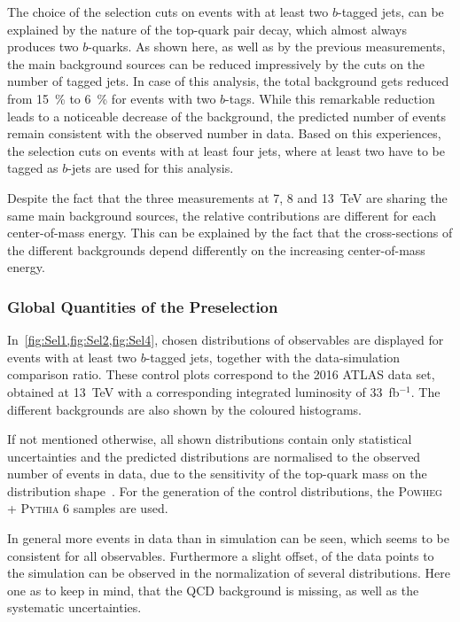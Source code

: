 The choice of the selection cuts on events with at least two $b$-tagged jets, can be explained by the nature of the top-quark pair decay, which almost always produces two $b$-quarks.  As shown here, as well as by the previous measurements, the main background sources can be reduced impressively by the cuts on the number of tagged jets. In case of this analysis, the total background gets reduced from  15~\% to 6~\% for events with two  $b$-tags. While this remarkable reduction leads to a noticeable decrease of the background, the predicted number of events remain consistent with the observed number in data. Based on this experiences, the selection cuts on events with at least four jets, where at least two have to be tagged as $b$-jets are used for this analysis.



Despite the fact that the three measurements at 7, 8 and 13~TeV are sharing the same main background sources, the relative contributions are different for each center-of-mass energy. This can be explained by the fact that the cross-sections of the different backgrounds depend differently on the increasing center-of-mass energy.


\subsubsection{Global Quantities of the Preselection}

In~\cref{fig:Sel1,fig:Sel2,fig:Sel4}, chosen distributions of observables are displayed for events with at least two $b$-tagged jets, together with the data-simulation comparison ratio. These control plots correspond to the  2016 ATLAS data set, obtained at 13~TeV with a corresponding integrated luminosity of 33~fb$^{-1}$. The different backgrounds are also shown by the coloured histograms. 

If not mentioned otherwise, all shown distributions contain only statistical uncertainties and the  predicted distributions are normalised to the observed number of events in data, due to the sensitivity of the top-quark mass on the distribution shape~\cite{ATLAS-CONF-2017-071}. For the generation of  the control distributions, the \textsc{Powheg} + \textsc{Pythia 6} samples are used.

In general more events in data than in simulation can be seen, which seems to be consistent for all observables. Furthermore a slight offset, of the data points to the simulation can be observed in the normalization of several distributions.    
Here one as to keep in mind, that the QCD background is missing, as well as the systematic uncertainties.

